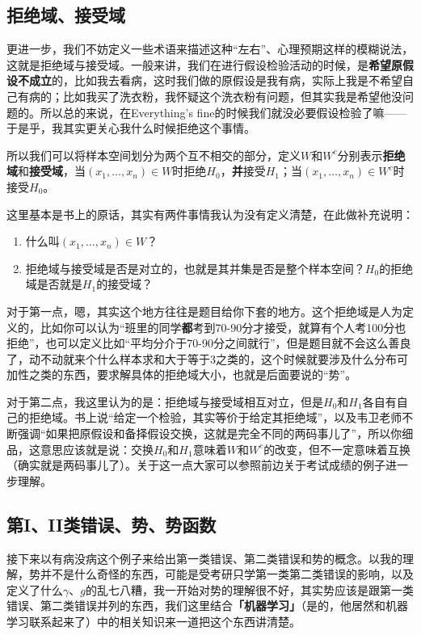 \documentclass[10pt, a4paper]{article}
\begin{document}
\subsection{拒绝域、接受域}
更进一步，我们不妨定义一些术语来描述这种“左右”、心理预期这样的模糊说法，这就是拒绝域与接受域。一般来讲，我们在进行假设检验活动的时候，是\textbf{希望原假设不成立}的，比如我去看病，这时我们做的原假设是我有病，实际上我是不希望自己有病的；比如我买了洗衣粉，我怀疑这个洗衣粉有问题，但其实我是希望他没问题的。所以总的来说，在Everything's fine的时候我们就没必要假设检验了嘛——于是乎，我其实更关心我什么时候拒绝这个事情。\par
所以我们可以将样本空间划分为两个互不相交的部分，定义$W$和$W^c$分别表示\textbf{拒绝域}和\textbf{接受域}，当$(x_1,\dots,x_n) \in W$时拒绝$H_0$，\textbf{并}接受$H_1$；当$(x_1,\dots,x_n) \in W^c$时接受$H_0$。\par
这里基本是书上的原话，其实有两件事情我认为没有定义清楚，在此做补充说明：
\begin{enumerate}
    \item 什么叫$(x_1,\dots,x_n) \in W$？
    \item 拒绝域与接受域是否是对立的，也就是其并集是否是整个样本空间？$H_0$的拒绝域是否就是$H_1$的接受域？
\end{enumerate} \par
对于第一点，嗯，其实这个地方往往是题目给你下套的地方。这个拒绝域是人为定义的，比如你可以认为“班里的同学\textbf{都}考到70-90分才接受，就算有个人考100分也拒绝”，也可以定义比如“平均分介于70-90分之间就行”，但是题目就不会这么善良了，动不动就来个什么样本求和大于等于3之类的，这个时候就要涉及什么分布可加性之类的东西，要求解具体的拒绝域大小，也就是后面要说的“势”。\par
对于第二点，我这里认为的是：拒绝域与接受域相互对立，但是$H_0$和$H_1$各自有自己的拒绝域。书上说“给定一个检验，其实等价于给定其拒绝域”，以及韦卫老师不断强调“如果把原假设和备择假设交换，这就是完全不同的两码事儿了”，所以你细品，这意思应该就是说：交换$H_0$和$H_1$意味着$W$和$W^c$的改变，但不一定意味着互换（确实就是两码事儿了）。关于这一点大家可以参照前边关于考试成绩的例子进一步理解。

\subsection{第I、II类错误、势、势函数}

接下来以有病没病这个例子来给出第一类错误、第二类错误和势的概念。以我的理解，势并不是什么奇怪的东西，可能是受考研只学第一类第二类错误的影响，以及定义了什么$\gamma$、$g$的乱七八糟，我一开始对势的理解很不好，其实势应该是跟第一类错误、第二类错误并列的东西，我们这里结合\textbf{「机器学习」}（是的，他居然和机器学习联系起来了）中的相关知识来一道把这个东西讲清楚。
\end{document}
